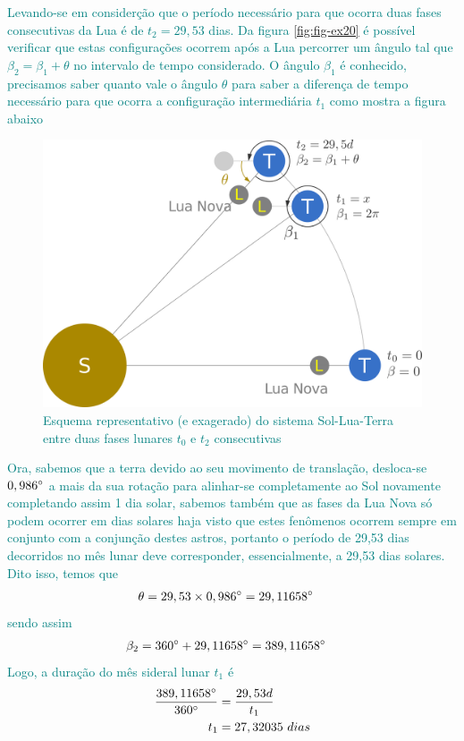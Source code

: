 \begin{sol}	
	\textcolor{teal} {
		Levando-se em considerção que o período necessário para que ocorra duas fases consecutivas da Lua é de $t_2=29,53$ dias. Da figura \eqref{fig:fig-ex20} é possível verificar que estas configurações ocorrem após a Lua percorrer um ângulo tal que $\beta_2=\beta_{1}+\theta$ no intervalo de tempo considerado. O ângulo $\beta_{1}$ é conhecido, precisamos saber quanto vale o ângulo $\theta$ para saber a diferença de tempo necessário para que ocorra a configuração intermediária $t_{1}$ como mostra a figura abaixo
		\begin{figure}[!ht]
			\centering
			\includegraphics[width=.5\linewidth]{fig/fig-q20.png}
			\caption{Esquema representativo (e exagerado) do sistema Sol-Lua-Terra entre duas fases lunares $t_0$ e $t_2$ consecutivas}
			\label{fig:fig-ex20}
		\end{figure}		
	}
	\newpage
	\textcolor{teal} {
		Ora, sabemos que a terra devido ao seu movimento de translação, desloca-se $0,986^{\circ}$ a mais da sua rotação para alinhar-se completamente ao Sol novamente completando assim 1 dia solar, sabemos também que as fases da Lua Nova só podem ocorrer em dias solares haja visto que estes fenômenos ocorrem sempre em conjunto com a conjunção destes astros, portanto o período de 29,53 dias decorridos no mês lunar deve corresponder, essencialmente, a 29,53 dias solares. Dito isso, temos que
		\begin{align}
			\theta&=29,53\times 0,986^{\circ}=29,11658^{\circ}
		\end{align}
		sendo assim
		\begin{align}
			\beta_{2}&=360^{\circ}+29,11658^{\circ}=389,11658^{\circ}
		\end{align}
		Logo, a duração do mês sideral lunar $t_1$ é
		\begin{align}
			\frac{389,11658^{\circ}}{360^{\circ}}&=\frac{29,53d}{t_1}\nonumber \\
			t_{1}&=27,32035 \ dias
		\end{align}
	}
\end{sol}
